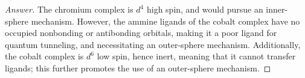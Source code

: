 \documentclass[../psets.tex]{subfiles}
\begin{document}
\begin{enumerate}[label={\Roman*)}]
\begin{enumerate}[label={\textbf{12.\arabic*}}]
        \begin{proof}[Answer]
            The chromium complex is $d^4$ high spin, and would pursue an inner-sphere mechanism. However, the ammine ligands of the cobalt complex have no occupied nonbonding or antibonding orbitals, making it a poor ligand for quantum tunneling, and necessitating an outer-sphere mechanism. Additionally, the cobalt complex is $d^6$ low spin, hence inert, meaning that it cannot transfer ligands; this further promotes the use of an outer-sphere mechanism.
        \end{proof}
    \end{enumerate}
\end{enumerate}
\end{document}
